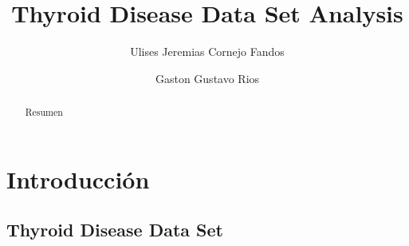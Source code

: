 \documentclass[osajnl,twocolumn,showpacs,superscriptaddress,10pt,floatfix]{revtex4-1} %
\begin{document}
\title{Thyroid Disease Data Set Analysis}

\author{Ulises Jeremias Cornejo Fandos}

\author{Gaston Gustavo Rios}


\begin{abstract}
Resumen
\end{abstract}


\ocis{}%

\maketitle %




\section{Introducción}

\subsection{Thyroid Disease Data Set }
\end{document}
